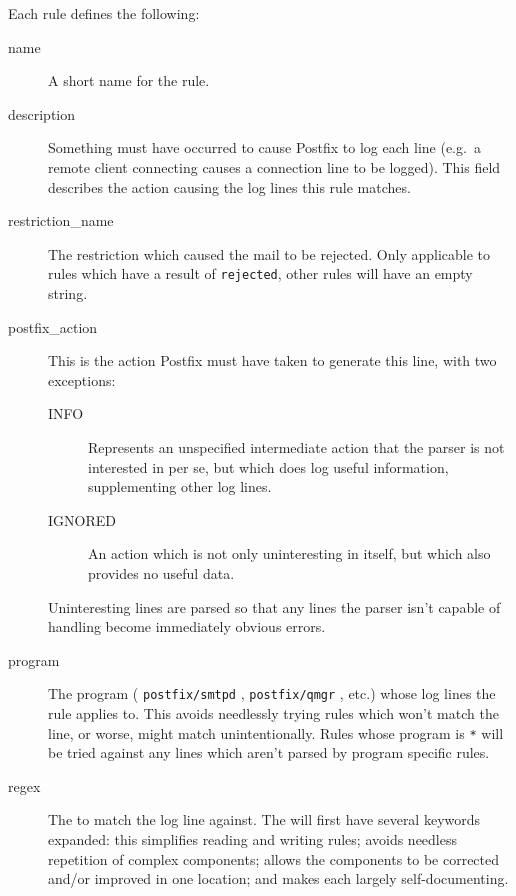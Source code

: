 \documentclass[a4paper,12pt,draft]{article}
\newcommand{\daemon}[1]{%
    \texttt{postfix/#1}%
}
\begin{document}
Each rule defines the following:

\begin{description}

    \item [name] A short name for the rule.

    \item [description] Something must have occurred to cause Postfix to
        log each line (e.g.\ a remote client connecting causes a connection
        line to be logged).  This field describes the action causing the
        log lines this rule matches.

    \item [restriction\_name] The restriction which caused the mail to be
        rejected.  Only applicable to rules which have a result of
        \texttt{rejected}, other rules will have an empty string.

    \item [postfix\_action] This is the action Postfix must have taken to
        generate this line, with two exceptions:

        \begin{description}

            \item [INFO] Represents an unspecified intermediate action that
                the parser is not interested in per se, but which does log
                useful information, supplementing other log lines.

            \item [IGNORED] An action which is not only uninteresting in
                itself, but which also provides no useful data.

        \end{description}

        Uninteresting lines are parsed so that any lines the parser isn't
        capable of handling become immediately obvious errors.

    \item [program] The program (\daemon{smtpd}, \daemon{qmgr}, etc.) whose
        log lines the rule applies to.  This avoids needlessly trying rules
        which won't match the line, or worse, might match unintentionally.
        Rules whose program is \texttt{*} will be tried against any lines
        which aren't parsed by program specific rules.

    \item [regex] The \regex{} to match the log line against.  The \regex{}
        will first have several keywords expanded: this simplifies reading
        and writing rules; avoids needless repetition of complex \regex{}
        components; allows the components to be corrected and/or improved
        in one location; and makes each \regex{} largely self-documenting.


\end{description}
\end{document}
